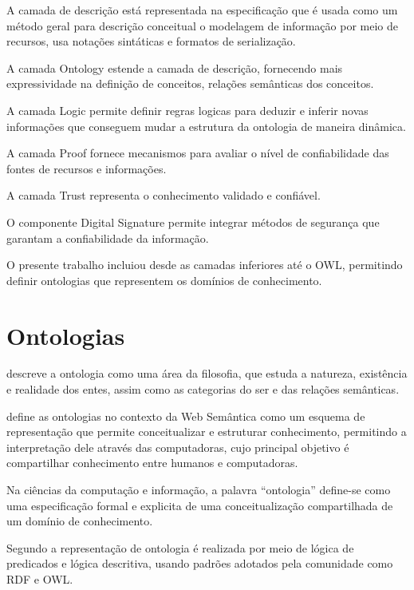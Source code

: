 A camada de descrição está representada na especificação \foreignlanguage{english}{}
que é usada como um método geral para descrição conceitual o modelagem
de informação por meio de recursos, usa notações sintáticas e formatos
de serialização.

A camada \foreignlanguage{english}{Ontology} estende a camada de descrição,
fornecendo mais expressividade na definição de conceitos, relações
semânticas dos conceitos.

A camada \foreignlanguage{english}{Logic} permite definir regras logicas
para deduzir e inferir novas informações que conseguem mudar a estrutura
da ontologia de maneira dinâmica.

A camada \foreignlanguage{english}{Proof} fornece mecanismos para
avaliar o nível de confiabilidade das fontes de recursos e informações.

A camada \foreignlanguage{english}{Trust} representa o conhecimento
validado e confiável.

O componente \foreignlanguage{english}{Digital Signature} permite
integrar métodos de segurança que garantam a confiabilidade da informação.

O presente trabalho incluiou desde as camadas inferiores até o OWL,
permitindo definir ontologias que representem os domínios de conhecimento.

\section{Ontologias}

\citet{Smith2007} descreve a ontologia como uma área da filosofia,
que estuda a natureza, existência e realidade dos entes, assim como
as categorias do ser e das relações semânticas.

\citet{allemang2011semantic} define as ontologias no contexto da
Web Semântica como um esquema de representação que permite conceitualizar
e estruturar conhecimento, permitindo a interpretação dele através
das computadoras, cujo principal objetivo é compartilhar conhecimento
entre humanos e computadoras.

Na ciências da computação e informação, a palavra ``ontologia''
define-se como uma especificação formal e explicita de uma conceitualização
compartilhada de um domínio de conhecimento.

Segundo \citet{Patel-schneider05buildingthe} a representação de ontologia
é realizada por meio de lógica de predicados e lógica descritiva,
usando padrões adotados pela comunidade como RDF e OWL.

